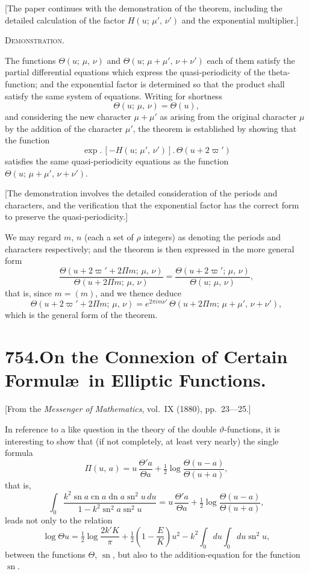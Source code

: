 \documentclass[11pt,a4paper]{book}
\begin{document}
[The paper continues with the demonstration of the theorem, including the detailed calculation of the factor $H(u;\, \mu',\, \nu')$ and the exponential multiplier.]

\medskip

\noindent\textsc{Demonstration.}

The functions $\Theta(u;\, \mu,\, \nu)$ and $\Theta(u;\, \mu + \mu',\, \nu + \nu')$ each of them satisfy the partial differential equations which express the quasi-periodicity of the theta-function; and the exponential factor is determined so that the product shall satisfy the same system of equations. Writing for shortness
\[
\Theta(u;\, \mu,\, \nu) = \Theta(u),
\]
and considering the new character $\mu + \mu'$ as arising from the original character $\mu$ by the addition of the character $\mu'$, the theorem is established by showing that the function
\[
\exp.\,[-H(u;\, \mu',\, \nu')].\, \Theta(u + 2\varpi')
\]
satisfies the same quasi-periodicity equations as the function $\Theta(u;\, \mu + \mu',\, \nu + \nu')$.

[The demonstration involves the detailed consideration of the periods and characters, and the verification that the exponential factor has the correct form to preserve the quasi-periodicity.]

We may regard $m$, $n$ (each a set of $\rho$ integers) as denoting the periods and characters respectively; and the theorem is then expressed in the more general form
\[
\frac{\Theta(u + 2\varpi' + 2\Pi m;\, \mu,\, \nu)}{\Theta(u + 2\Pi m;\, \mu,\, \nu)} = \frac{\Theta(u + 2\varpi';\, \mu,\, \nu)}{\Theta(u;\, \mu,\, \nu)},
\]
that is, since $m = (m)$, and we thence deduce
\[
\Theta(u + 2\varpi' + 2\Pi m;\, \mu,\, \nu) = e^{2\pi i m \nu'}\, \Theta(u + 2\Pi m;\, \mu + \mu',\, \nu + \nu'),
\]
which is the general form of the theorem.


\newpage
\section*{\textbf{754.}\quad On the Connexion of Certain Formul\ae\ in Elliptic Functions.}

[From the \textit{Messenger of Mathematics}, vol.~IX (1880), pp.~23---25.]

\medskip

In reference to a like question in the theory of the double $\vartheta$-functions, it is interesting to show that (if not completely, at least very nearly) the single formula
\[
\Pi(u,\, a) = u\, \frac{\Theta'a}{\Theta a} + \tfrac{1}{2}\log \frac{\Theta(u-a)}{\Theta(u+a)},
\]
that is,
\[
\int_0 \frac{k^2 \operatorname{sn} a \operatorname{cn} a \operatorname{dn} a \operatorname{sn}^2 u\, du}{1 - k^2 \operatorname{sn}^2 a \operatorname{sn}^2 u} = u\, \frac{\Theta'a}{\Theta a} + \tfrac{1}{2}\log \frac{\Theta(u-a)}{\Theta(u+a)},
\]
leads not only to the relation
\[
\log \Theta u = \tfrac{1}{2}\log \frac{2k'K}{\pi} + \tfrac{1}{2}\left(1 - \frac{E}{K}\right)u^2 - k^2 \int_0 du \int_0 du \operatorname{sn}^2 u,
\]
between the functions $\Theta$, $\operatorname{sn}$, but also to the addition-equation for the function $\operatorname{sn}$.
\end{document}
